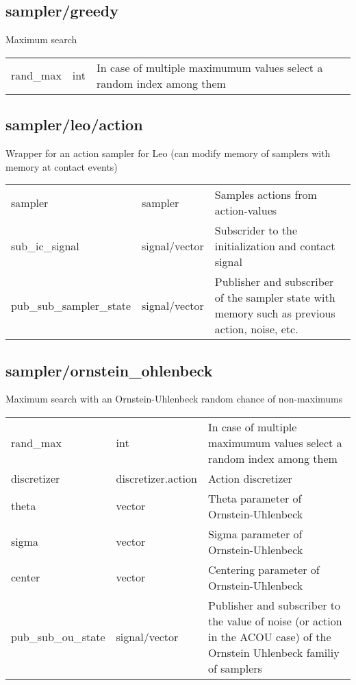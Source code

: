 \subsection{sampler/greedy}
\noindent Maximum search\\

\noindent\begin{tabular}{@{}lll@{}}
rand\_max&int&In case of multiple maximumum values select a random index among them\\
\end{tabular}
\subsection{sampler/leo/action}
\noindent Wrapper for an action sampler for Leo (can modify memory of samplers with memory at contact events)\\

\noindent\begin{tabular}{@{}lll@{}}
sampler&sampler&Samples actions from action-values\\
sub\_ic\_signal&signal/vector&Subscrider to the initialization and contact signal\\
pub\_sub\_sampler\_state&signal/vector&Publisher and subscriber of the sampler state with memory such as previous action, noise, etc.\\
\end{tabular}
\subsection{sampler/ornstein\_ohlenbeck}
\noindent Maximum search with an Ornstein-Uhlenbeck random chance of non-maximums\\

\noindent\begin{tabular}{@{}lll@{}}
rand\_max&int&In case of multiple maximumum values select a random index among them\\
discretizer&discretizer.action&Action discretizer\\
theta&vector&Theta parameter of Ornstein-Uhlenbeck\\
sigma&vector&Sigma parameter of Ornstein-Uhlenbeck\\
center&vector&Centering parameter of Ornstein-Uhlenbeck\\
pub\_sub\_ou\_state&signal/vector&Publisher and subscriber to the value of noise (or action in the ACOU case) of the Ornstein Uhlenbeck familiy of samplers\\
\end{tabular}
